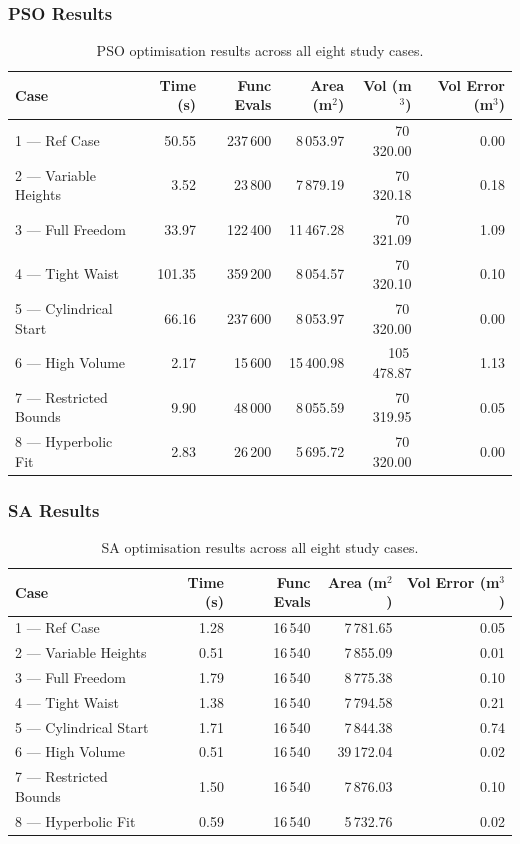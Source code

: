 \subsubsection{PSO Results}

\begin{table}[h!]
\centering
\caption{PSO optimisation results across all eight study cases.}
\label{tab:pso_results}
\begin{tabular}{l r r r r r}
\hline
\textbf{Case} & \textbf{Time (s)} & \textbf{Func Evals} & \textbf{Area (m$^2$)} & \textbf{Vol (m$^3$)} & \textbf{Vol Error (m$^3$)} \\
\hline
1 --- Ref Case           & 50.55  & 237\,600 & 8\,053.97  & 70\,320.00  & 0.00 \\
2 --- Variable Heights   & 3.52   & 23\,800  & 7\,879.19  & 70\,320.18  & 0.18 \\
3 --- Full Freedom       & 33.97  & 122\,400 & 11\,467.28 & 70\,321.09  & 1.09 \\
4 --- Tight Waist        & 101.35 & 359\,200 & 8\,054.57  & 70\,320.10  & 0.10 \\
5 --- Cylindrical Start  & 66.16  & 237\,600 & 8\,053.97  & 70\,320.00  & 0.00 \\
6 --- High Volume        & 2.17   & 15\,600  & 15\,400.98 & 105\,478.87 & 1.13 \\
7 --- Restricted Bounds  & 9.90   & 48\,000  & 8\,055.59  & 70\,319.95  & 0.05 \\
8 --- Hyperbolic Fit     & 2.83   & 26\,200  & 5\,695.72  & 70\,320.00  & 0.00 \\
\hline
\end{tabular}
\end{table}

\subsubsection{SA Results}

\begin{table}[h!]
\centering
\caption{SA optimisation results across all eight study cases.}
\label{tab:sa_results}
\begin{tabular}{l r r r r}
\hline
\textbf{Case} & \textbf{Time (s)} & \textbf{Func Evals} & \textbf{Area (m$^2$)} & \textbf{Vol Error (m$^3$)} \\
\hline
1 --- Ref Case           & 1.28  & 16\,540 & 7\,781.65  & 0.05 \\
2 --- Variable Heights   & 0.51  & 16\,540 & 7\,855.09  & 0.01 \\
3 --- Full Freedom       & 1.79  & 16\,540 & 8\,775.38  & 0.10 \\
4 --- Tight Waist        & 1.38  & 16\,540 & 7\,794.58  & 0.21 \\
5 --- Cylindrical Start  & 1.71  & 16\,540 & 7\,844.38  & 0.74 \\
6 --- High Volume        & 0.51  & 16\,540 & 39\,172.04 & 0.02 \\
7 --- Restricted Bounds  & 1.50  & 16\,540 & 7\,876.03  & 0.10 \\
8 --- Hyperbolic Fit     & 0.59  & 16\,540 & 5\,732.76  & 0.02 \\
\hline
\end{tabular}
\end{table}